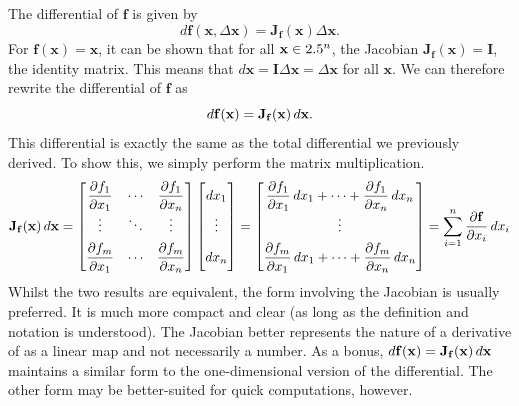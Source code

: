 \documentclass[a4paper,12pt]{article}
\begin{document}
The differential of $\mathbf{f}$ is given by
\begin{equation*}
    d\mathbf{f}(\mathbf{x}, \Delta\mathbf{x}) = \mathbf{J_f}(\mathbf{x})\Delta\mathbf{x}.
\end{equation*}
For $\mathbf{f}(\mathbf{x}) = \mathbf{x}$, it can be shown that for all $\mathbf{x} \in 2.5^n$, the Jacobian $\mathbf{J_f}(\mathbf{x}) = \mathbf{I}$, the identity matrix.
This means that $d\mathbf{x} = \mathbf{I}\Delta\mathbf{x} = \Delta\mathbf{x}$ for all $\mathbf{x}$.
We can therefore rewrite the differential of $\mathbf{f}$ as
\begin{equation*}
    d\mathbf{f}(\mathbf{x}) = \mathbf{J_f}(\mathbf{x}) \mathop{}\!d\mathbf{x}.
\end{equation*}
This differential is exactly the same as the total differential we previously derived.
To show this, we simply perform the matrix multiplication.
\begin{equation*}
    \mathbf{J_f}(\mathbf{x}) \diff\mathbf{x} = \begin{bmatrix}
        \dfrac{\partial f_1}{\partial x_1} & \cdots & \dfrac{\partial f_1}{\partial x_n} \\[0.5em]
        \vdots & \ddots & \vdots \\[0.5em]
        \dfrac{\partial f_m}{\partial x_1} & \cdots & \dfrac{\partial f_m}{\partial x_n}
    \end{bmatrix}
    \begin{bmatrix}
        dx_1 \vphantom{\dfrac{\partial f_1}{\partial x_n}}\\[0.5em]
        \vdots \\[0.5em]
        dx_n \vphantom{\dfrac{\partial f_m}{\partial x_n}}
    \end{bmatrix}
    = \begin{bmatrix}
        \dfrac{\partial f_1}{\partial x_1}\diff x_1 + \cdots + \dfrac{\partial f_1}{\partial x_n}\diff x_n\\[0.5em]
        \vdots \\[0.5em]
        \dfrac{\partial f_m}{\partial x_1}\diff x_1 + \cdots + \dfrac{\partial f_m}{\partial x_n}\diff x_n
    \end{bmatrix}
    = \sum_{i=1}^{n} \frac{\partial\mathbf{f}}{\partial x_i} \diff x_i
\end{equation*}
Whilst the two results are equivalent, the form involving the Jacobian is usually preferred.
It is much more compact and clear (as long as the definition and notation is understood).
The Jacobian better represents the nature of a derivative of as a linear map and not necessarily a number.
As a bonus, $d\mathbf{f}(\mathbf{x}) = \mathbf{J_f}(\mathbf{x})\mathop{}\!d\mathbf{x}$ maintains a similar form to the one-dimensional version of the differential.
The other form may be better-suited for quick computations, however.
\end{document}
